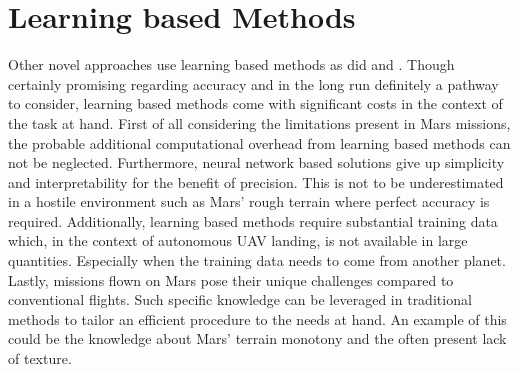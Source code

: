 \section{Learning based Methods}
Other novel approaches use learning based methods as did \citep{Neves2024Multimodal, Abdollahzadeh2022SafeLandingZones} and \citep{TovanchePicon2024RealTimeSafeValidation}. Though certainly promising regarding accuracy and in the long run definitely a pathway to consider, learning based methods come with significant costs in the context of the task at hand. First of all considering the limitations present in Mars missions, the probable additional computational overhead from learning based methods can not be neglected. Furthermore, neural network based solutions give up simplicity and interpretability for the benefit of precision. This is not to be underestimated in a hostile environment such as Mars' rough terrain where perfect accuracy is required. Additionally, learning based methods require substantial training data which, in the context of autonomous UAV landing, is not available in large quantities. Especially when the training data needs to come from another planet. Lastly, missions flown on Mars pose their unique challenges compared to conventional flights. Such specific knowledge can be leveraged in traditional methods to tailor an efficient procedure to the needs at hand. An example of this could be the knowledge about Mars' terrain monotony and the often present lack of texture.
